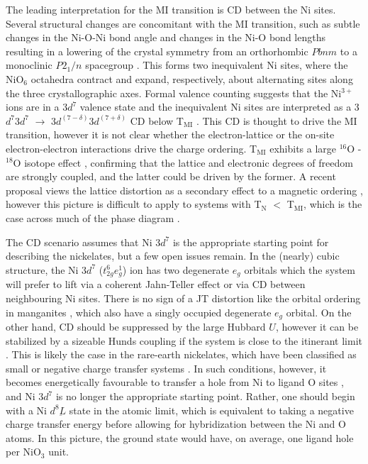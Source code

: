 \documentclass[showpacs,preprintnumbers,amsmath,amssymb,prl,aps,twocolumn,superscriptaddress]{revtex4}
\newcommand{\ligand}{{\underbar L}}
\begin{document}
The leading interpretation for the MI transition is CD between the Ni sites. 
Several structural changes are concomitant 
with the MI transition, such as subtle changes in the Ni-O-Ni bond 
angle and changes in the Ni-O bond lengths resulting in a lowering of   
the crystal symmetry from an orthorhombic $Pbnm$ to a monoclinic $P2_1/n$ 
spacegroup \cite{Review,AlonsoPRB2000,AlonsoPRB2001,PiamontezePRB2005,
AlonsoPRB2013}. This forms two inequivalent Ni sites, where the 
NiO$_6$ octahedra contract and expand, respectively, about alternating
sites along  
the three crystallographic axes. Formal valence counting suggests that the 
Ni$^{3+}$ ions are  in a 3$d^7$ valence state and the inequivalent Ni sites 
are interpreted as a 3$d^{7}$3$d^{7}$ $\rightarrow$ 
3$d^{(7-\delta)}$3$d^{(7+\delta)}$ CD below T$_{\mathrm{MI}}$ 
\cite{MedardePRB2008, MedardePRB2009, GarciaMunozPRB2009, AlonsoPRB2013}. 
This CD is thought to drive the MI transition, however 
it is not clear whether the electron-lattice or the on-site electron-electron 
interactions drive the charge ordering.  
T$_\mathrm{MI}$ exhibits a large $^{16}$O - $^{18}$O isotope effect 
\cite{MedardeIsotope}, confirming that the lattice 
and electronic degrees of freedom are strongly coupled, 
and the latter could be driven by the former.
A recent proposal views the lattice distortion as a secondary effect to a   
magnetic ordering \cite{BalentsPRB2011,BalentsPRL2011}, however 
this picture is difficult to apply to systems with  
T$_\mathrm{N}$ $<$ T$_\mathrm{MI}$, which is the case across much of the 
phase diagram \cite{Review}. 


The CD scenario assumes that Ni 3$d^{7}$ is the appropriate
starting point for describing the nickelates, but a few open issues
remain.  In the (nearly) cubic structure, the Ni 3$d^{7}$
($t_{2g}^6e_g^1$) ion has two degenerate $e_g$ orbitals which the
system will prefer to lift via a coherent Jahn-Teller effect or via CD
between neighbouring Ni sites.  There is no sign 
of a JT distortion \cite{MedardeIsotope}
like the orbital ordering in manganites
\cite{Maganites}, which also have a singly occupied degenerate $e_g$
orbital. On the other hand, CD should be suppressed by the large
Hubbard $U$, however it can be stabilized by a sizeable Hunds coupling
if the system is close to the itinerant limit
\cite{MazinPRL2007}. This  is likely the case in the
rare-earth nickelates, which have been classified as small or negative
charge transfer systems
\cite{MizokawaPRB1995,MizokawaPRB2000,ParkPRL2012,LauPRL2013,Bodenthin2011,
  AbbatePRB2002,HoribePRB2007,HanPRB2012,BlancaRomeroPRB2011,AnisiovPRB1999}.
In such conditions, however, it becomes energetically favourable to
transfer a hole from Ni to ligand O sites \cite{ZaanenPRL1985},
and Ni $3d^7$  is no longer the appropriate starting point.
Rather, one should begin with a Ni $d^8\ligand$ state in the atomic
limit, which is equivalent to taking a negative charge transfer energy
before allowing for hybridization between the Ni and O atoms. In this
picture, the ground state would have, on average, one ligand
hole per NiO$_3$ unit.
\end{document}

